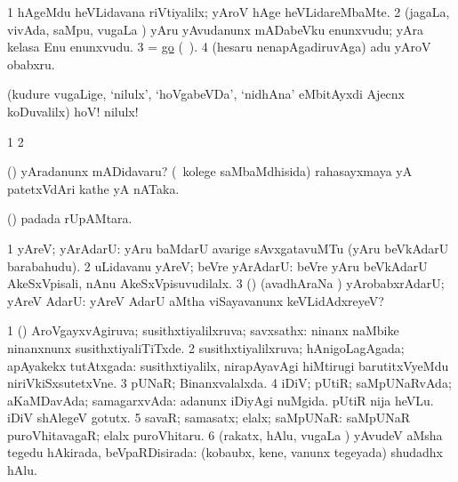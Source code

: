 \noindent 
\gl{\pagu}
\bmng
\bnum
\num{1}  hAgeMdu heVLidavana riVtiyalilx; yAroV hAge heVLidareMbaMte. 
\num{2}    (jagaLa, vivAda, saMpu, \mo vugaLa \vi) yAru yAvudanunx mADabeVku enunxvudu; yAra kelasa Enu enunxvudu. 
\num{3}  = \hyperref{kandict_g.pdf}{G}{gopagu67}{go} (\pagu\ ). 
\num{4}  (hesaru nenapAgadiruvAga) adu yAroV obabxru. 
\enum
\emng
\eentry

\bentry
{}
\gl{\BAavayx}
\bmng
(kudure \mo vugaLige, `nilulx', `hoVgabeVDa', `nidhAna' eMbitAyxdi Ajecnx koDuvalilx) hoV! nilulx! 
\emng
\eentry

\bentry
{}
\gl{\saMkiSx}
\bmng
\bnum
\num{1}  
\num{2}  
\enum
\emng
\eentry

\bentry
{}
\gl{\nA}
\bmng
(\AmA) yAradanunx mADidavaru? (\kanmu\ kolege saMbaMdhisida) rahasayxmaya yA patetxVdAri kathe yA nATaka. 
\emng
\eentry

\bentry
{}
\gl{\sanA}
\bmng
(\kAparx)  padada rUpAMtara. 
\emng
\eentry

\bentry
{} 
\gl{\sanA}
\expl{}
\bmng
\bnum
\num{1} yAreV; yArAdarU:  yAru baMdarU avarige sAvxgatavuMTu (yAru beVkAdarU barabahudu). 
\num{2} uLidavanu yAreV; beVre yArAdarU:  beVre yAru beVkAdarU AkeSxVpisali, nAnu AkeSxVpisuvudilalx. 
\num{3} (\AmA) (avadhAraNa \parx) yArobabxrAdarU; yAreV AdarU:  yAreV AdarU aMtha viSayavanunx keVLidAdxreyeV? 
\enum
\emng
\eentry

\bentry
{} 
\gl{\gu}
\expl{}
\bmng
\bnum
\num{1} (\pArxparx) AroVgayxvAgiruva; susithxtiyalilxruva; savxsathx:  ninanx naMbike ninanxnunx susithxtiyaliTiTxde. 
\num{2} susithxtiyalilxruva; hAnigoLagAgada; apAyakekx tutAtxgada:  susithxtiyalilx, nirapAyavAgi hiMtirugi barutitxVyeMdu niriVkiSxsutetxVne. 
\num{3} pUNaR; Binanxvalalxda. 
\num{4} iDiV; pUtiR; saMpUNaRvAda; aKaMDavAda; samagarxvAda:  adanunx iDiyAgi nuMgida.  pUtiR nija heVLu.  iDiV shAlegeV gotutx. 
\num{5} savaR; samasatx; elalx; saMpUNaR:  saMpUNaR puroVhitavagaR; elalx puroVhitaru. 
\num{6} (rakatx, hAlu, \mo vugaLa \vi) yAvudeV aMsha tegedu hAkirada, beVpaRDisirada:  (kobaubx, kene, \mo vanunx tegeyada) shudadhx hAlu. 
\enum
\emng

